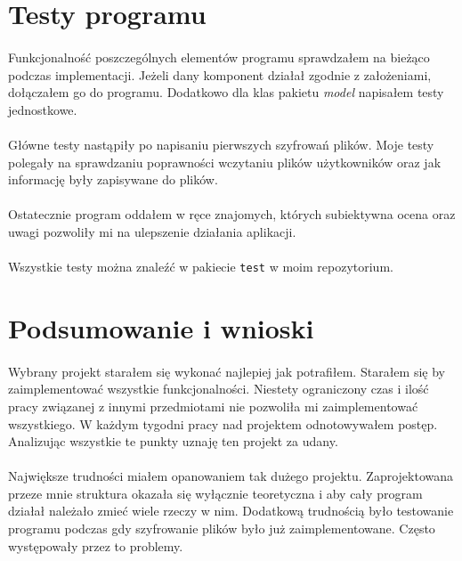 \documentclass[a4paper]{article}
\newcommand{\prog}{\texttt}
\begin{document}
\section{Testy programu}
\paragraph{}
Funkcjonalność poszczególnych elementów programu sprawdzałem na bieżąco podczas implementacji.
Jeżeli dany komponent działał zgodnie z założeniami, dołączałem go do programu.
Dodatkowo dla klas pakietu \textit{model} napisałem testy jednostkowe.
\paragraph{}
Główne testy nastąpiły po napisaniu pierwszych szyfrowań plików. Moje testy polegały na sprawdzaniu poprawności wczytaniu plików użytkowników oraz jak informację były zapisywane do plików.
\paragraph{}
Ostatecznie program oddałem w ręce znajomych, których subiektywna ocena oraz uwagi pozwoliły mi na ulepszenie działania aplikacji.
\paragraph{}
Wszystkie testy można znaleźć w pakiecie \prog{test} w moim repozytorium.

\section{Podsumowanie i wnioski}
\paragraph{}
Wybrany projekt starałem się wykonać najlepiej jak potrafiłem. Starałem się by zaimplementować wszystkie funkcjonalności. Niestety ograniczony czas i ilość pracy związanej z innymi przedmiotami nie pozwoliła mi zaimplementować wszystkiego. W każdym tygodni pracy nad projektem odnotowywałem postęp. Analizując wszystkie te punkty uznaję ten projekt za udany.
\paragraph{}
Największe trudności miałem opanowaniem tak dużego projektu. Zaprojektowana przeze mnie struktura okazała się wyłącznie teoretyczna i aby cały program działał należało zmieć wiele rzeczy w nim. Dodatkową trudnością było testowanie programu podczas gdy szyfrowanie plików było już zaimplementowane. Często występowały przez to problemy.
\end{document}
